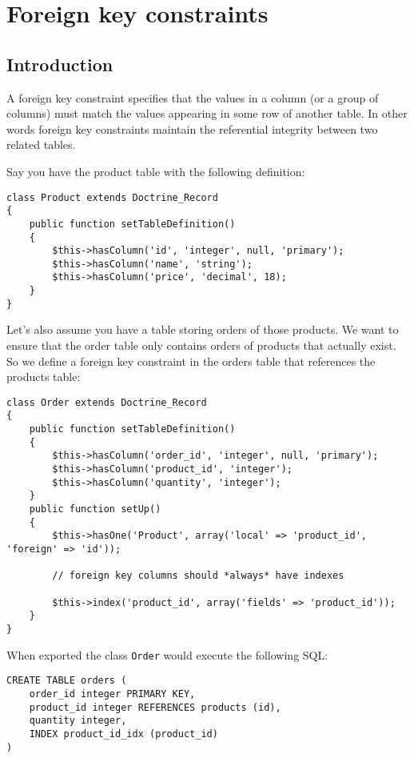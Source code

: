 \documentclass[11pt,a4paper]{report}
\begin{document}
\section{Foreign key constraints}
\subsection{Introduction}
A foreign key constraint specifies that the values in a column (or a group of columns) must match the values appearing in some row of another table. In other words foreign key constraints maintain the referential integrity between two related tables.

Say you have the product table with the following definition:

\begin{verbatim}
class Product extends Doctrine_Record
{
    public function setTableDefinition()
    {
        $this->hasColumn('id', 'integer', null, 'primary');
        $this->hasColumn('name', 'string');
        $this->hasColumn('price', 'decimal', 18);
    }
}
\end{verbatim}

Let's also assume you have a table storing orders of those products. We want to ensure that the order table only contains orders of products that actually exist. So we define a foreign key constraint in the orders table that references the products table:

\begin{verbatim}
class Order extends Doctrine_Record
{
    public function setTableDefinition()
    {
        $this->hasColumn('order_id', 'integer', null, 'primary');
        $this->hasColumn('product_id', 'integer');
        $this->hasColumn('quantity', 'integer');
    }
    public function setUp()
    {
        $this->hasOne('Product', array('local' => 'product_id', 'foreign' => 'id'));

        // foreign key columns should *always* have indexes

        $this->index('product_id', array('fields' => 'product_id'));
    }
}
\end{verbatim}

When exported the class \texttt{Order} would execute the following SQL:

\begin{verbatim}
CREATE TABLE orders (
    order_id integer PRIMARY KEY,
    product_id integer REFERENCES products (id),
    quantity integer,
    INDEX product_id_idx (product_id)
)
\end{verbatim}
\end{document}
